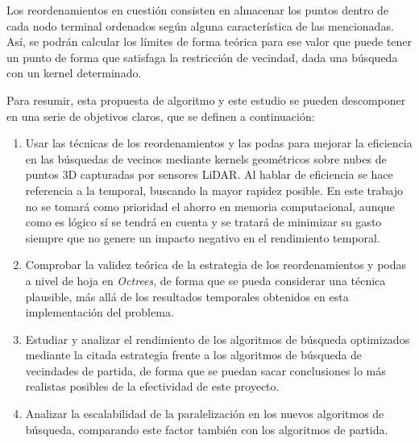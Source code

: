 Los reordenamientos en cuestión consisten en almacenar los puntos dentro de cada nodo terminal ordenados según alguna característica de las mencionadas. Así, se podrán calcular los límites de forma teórica para ese valor que puede tener un punto de forma que satisfaga la restricción de vecindad, dada una búsqueda con un kernel determinado.

Para resumir, esta propuesta de algoritmo y este estudio se pueden descomponer en una serie de objetivos claros, que se definen a continuación:
\begin{enumerate}
    \item  Usar las técnicas de los reordenamientos y las podas para mejorar la eficiencia en las búsquedas de vecinos mediante kernels geométricos sobre nubes de puntos 3D capturadas por sensores LiDAR. Al hablar de eficiencia se hace referencia a la temporal, buscando la mayor rapidez posible. En este trabajo no se tomará como prioridad el ahorro en memoria computacional, aunque como es lógico sí se tendrá en cuenta y se tratará de minimizar su gasto siempre que no genere un impacto negativo en el rendimiento temporal.
    \item Comprobar la validez teórica de la estrategia de los reordenamientos y podas a nivel de hoja en \textit{Octrees}, de forma que se pueda considerar una técnica plausible, más allá de los resultados temporales obtenidos en esta implementación del problema.
    \item Estudiar y analizar el rendimiento de los algoritmos de búsqueda optimizados mediante la citada estrategia frente a los algoritmos de búsqueda de vecindades de partida, de forma que se puedan sacar conclusiones lo más realistas posibles de la efectividad de este proyecto.
    \item Analizar la escalabilidad de la paralelización en los nuevos algoritmos de búsqueda, comparando este factor también con los algoritmos de partida.
\end{enumerate}
